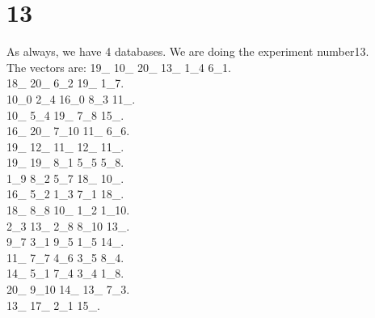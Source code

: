 \chapter{13}
\indent As always, we have 4 databases. We are doing the experiment number13.\\
The vectors are:
19\_ 10\_ 20\_ 13\_ 1\_4 6\_1.\\18\_ 20\_ 6\_2 19\_ 1\_7.\\10\_0 2\_4 16\_0 8\_3 11\_.\\10\_ 5\_4 19\_ 7\_8 15\_.\\16\_ 20\_ 7\_10 11\_ 6\_6.\\19\_ 12\_ 11\_ 12\_ 11\_.\\19\_ 19\_ 8\_1 5\_5 5\_8.\\1\_9 8\_2 5\_7 18\_ 10\_.\\16\_ 5\_2 1\_3 7\_1 18\_.\\18\_ 8\_8 10\_ 1\_2 1\_10.\\2\_3 13\_ 2\_8 8\_10 13\_.\\9\_7 3\_1 9\_5 1\_5 14\_.\\11\_ 7\_7 4\_6 3\_5 8\_4.\\14\_ 5\_1 7\_4 3\_4 1\_8.\\20\_ 9\_10 14\_ 13\_ 7\_3.\\13\_ 17\_ 2\_1 15\_.\\